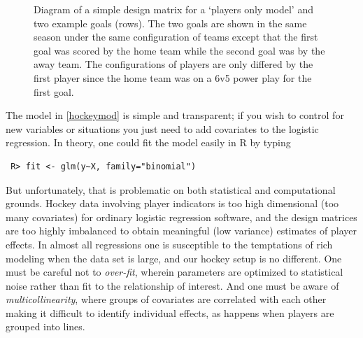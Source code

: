 \begin{figure}[hbt]
    \centering
    \caption{Diagram of a simple design matrix for a `players only model' and two example goals (rows). The two goals are shown in the same season under the same configuration of teams except that the first goal was scored by the home team while the second goal was by the away team. The configurations of players are only differed by the first player since the home team was on a 6v5 power play for the first goal. }\label{fig:data}
\end{figure}

The model in \ref{hockeymod} is simple and transparent; if you wish to control
for new variables or situations you just need to add covariates to the
logistic regression. In theory, one could fit the model easily in  {\sf R} by
typing \begin{verbatim} R> fit <- glm(y~X, family="binomial") \end{verbatim}
But unfortunately, that is problematic on both statistical and computational
grounds.   Hockey data involving player indicators is too high dimensional
(too many covariates) for ordinary logistic regression software, and the
design matrices are too highly imbalanced to obtain meaningful (low variance)
estimates of player effects.   In almost all regressions one is susceptible to
the temptations of rich modeling when the data set is large, and our hockey
setup is no different. One must be careful not to {\em over-fit}, wherein
parameters are optimized to statistical noise rather than fit to the
relationship of interest.  And one must be aware of {\em multicollinearity},
where groups of covariates are correlated with each other making it difficult
to identify individual effects, as happens when players are grouped into
lines.



